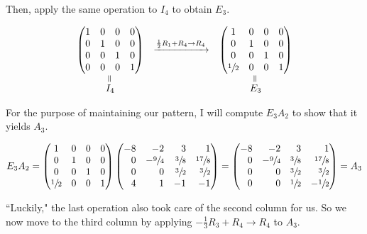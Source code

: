 \documentclass[12pt]{article}
\newcommand{\veq}{\mathrel{\rotatebox{90}{$=$}}}
\begin{document}
Then, apply the same operation to $I_4$ to obtain $E_3$.

$$
\begin{array}{ccc}
    \begin{pmatrix*}[c]
        1 & 0 & 0 & 0 \\
        0 & 1 & 0 & 0 \\
        0 & 0 & 1 & 0 \\
        0 & 0 & 0 & 1
    \end{pmatrix*}
    &\xrightarrow{\frac{1}{2}R_1 + R_4 \to R_4}
    &\begin{pmatrix*}[c]
        1 & 0 & 0 & 0 \\
        0 & 1 & 0 & 0 \\
        0 & 0 & 1 & 0 \\
        \sfrac{1}{2} & 0 & 0 & 1
    \end{pmatrix*}
    \\
    \overset{\veq}{I_4} & & \overset{\veq}{E_3}
\end{array}
$$

For the purpose of maintaining our pattern, I will compute $E_3A_2$ to show that it yields $A_3$.

$$
E_3A_2 = \begin{pmatrix*}[c]
    1 & 0 & 0 & 0 \\
    0 & 1 & 0 & 0 \\
    0 & 0 & 1 & 0 \\
    \sfrac{1}{2} & 0 & 0 & 1
\end{pmatrix*}
\begin{pmatrix*}[r]
    -8 & -2 & 3 & 1 \\
    0 & -\sfrac{9}{4} & \sfrac{3}{8}  & \sfrac{17}{8} \\
    0 & 0 & \sfrac{3}{2} & \sfrac{3}{2} \\
    4 & 1 & -1 & -1
\end{pmatrix*}
= \begin{pmatrix*}[r]
    -8 & -2 & 3 & 1 \\
    0 & -\sfrac{9}{4} & \sfrac{3}{8}  & \sfrac{17}{8} \\
    0 & 0 & \sfrac{3}{2} & \sfrac{3}{2} \\
    0 & 0 & \sfrac{1}{2} & -\sfrac{1}{2}
\end{pmatrix*}
= A_3
$$

``Luckily," the last operation also took care of the second column for us. So we now move to the third column by applying $-\frac{1}{3}R_3 + R_4 \to R_4$ to $A_3$.
\end{document}
